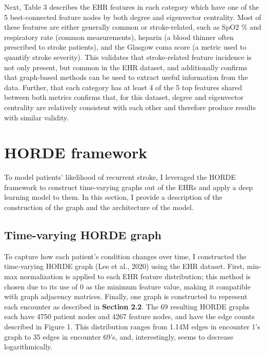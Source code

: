 \documentclass{article}
\begin{document}
Next, Table 3 describes the EHR features in each category which have one of the 5 best-connected feature nodes by both degree and eigenvector centrality. Most of these features are either generally common or stroke-related, such as SpO2 \% and respiratory rate (common measurements), heparin (a blood thinner often prescribed to stroke patients), and the Glasgow coma score (a metric used to quantify stroke severity). This validates that stroke-related feature incidence is not only present, but common in the EHR dataset, and additionally confirms that graph-based methods can be used to extract useful information from the data. Further, that each category has at least 4 of the 5 top features shared between both metrics confirms that, for this dataset, degree and eigenvector centrality are relatively consistent with each other and therefore produce results with similar validity.

\section{HORDE framework}

To model patients' likelihood of recurrent stroke, I leveraged the HORDE framework to construct time-varying graphs out of the EHRs and apply a deep learning model to them. In this section, I provide a description of the construction of the graph and the architecture of the model.

\subsection{Time-varying HORDE graph}

To capture how each patient's condition changes over time, I constructed the time-varying HORDE graph (Lee et al., 2020) using the EHR dataset. First, min-max normalization is applied to each EHR feature distribution; this method is chosen due to its use of 0 as the minimum feature value, making it compatible with graph adjacency matrices. Finally, one graph is constructed to represent each encounter as described in \textbf{Section 2.2}. The 69 resulting HORDE graphs each have 4750 patient nodes and 4267 feature nodes, and have the edge counts described in Figure 1. This distribution ranges from 1.14M edges in encounter 1's graph to 35 edges in encounter 69's, and, interestingly, seems to decrease logarithmically.
\end{document}
